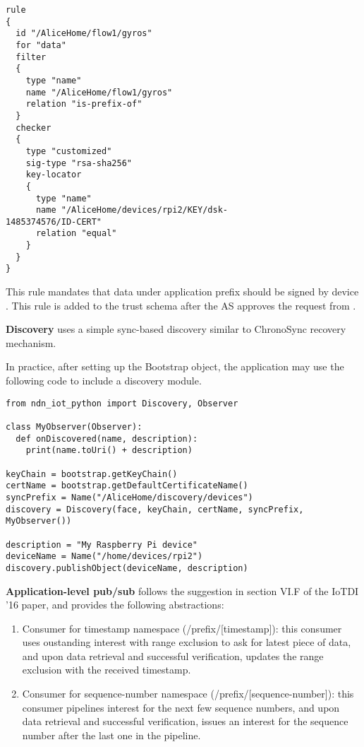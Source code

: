 \begin{verbatim}
rule 
{
  id "/AliceHome/flow1/gyros"
  for "data"
  filter 
  {
    type "name"
    name "/AliceHome/flow1/gyros"
    relation "is-prefix-of"
  }
  checker 
  {
    type "customized"
    sig-type "rsa-sha256"
    key-locator 
    {
      type "name"
      name "/AliceHome/devices/rpi2/KEY/dsk-
1485374576/ID-CERT"
      relation "equal"
    }
  }
}
\end{verbatim}
This rule mandates that data under application prefix  should be signed by device .
This rule is added to the trust schema after the AS approves the request from .

\textbf{Discovery} uses a simple sync-based discovery similar to ChronoSync recovery mechanism.

In practice, after setting up the Bootstrap object, the application may use the following code to include a discovery module.
\begin{verbatim}
from ndn_iot_python import Discovery, Observer

class MyObserver(Observer):
  def onDiscovered(name, description):
    print(name.toUri() + description)

keyChain = bootstrap.getKeyChain()
certName = bootstrap.getDefaultCertificateName()
syncPrefix = Name("/AliceHome/discovery/devices")
discovery = Discovery(face, keyChain, certName, syncPrefix, MyObserver())

description = "My Raspberry Pi device"
deviceName = Name("/home/devices/rpi2")
discovery.publishObject(deviceName, description)
\end{verbatim}

\textbf{Application-level pub/sub} follows the suggestion in section VI.F of the IoTDI '16 paper, and provides the following abstractions:
\begin{enumerate}
\item Consumer for timestamp namespace (/prefix/[timestamp]): this consumer uses oustanding interest with range exclusion to ask for latest piece of data, and upon data retrieval and successful verification, updates the range exclusion with the received timestamp.
\item Consumer for sequence-number namespace (/prefix/[sequence-number]): this consumer pipelines interest for the next few sequence numbers, and upon data retrieval and successful verification, issues an interest for the sequence number after the last one in the pipeline.
\end{enumerate}

